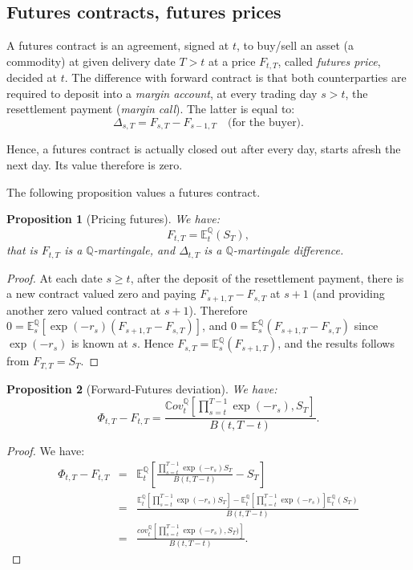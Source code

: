 \documentclass[
  12pt,
]{book}
\newtheorem{proposition}{Proposition}[chapter]
\theoremstyle{definition}
\theoremstyle{definition}
\theoremstyle{definition}
\theoremstyle{definition}
\theoremstyle{remark}
\begin{document}
\hypertarget{FCFPFutures}{%
\subsection{Futures contracts, futures prices}\label{FCFPFutures}}

A futures contract is an agreement, signed at \(t\), to buy/sell an asset (a commodity) at given delivery date \(T>t\) at a price \(F_{t,T}\), called \emph{futures price}, decided at \(t\). The difference with forward contract is that both counterparties are required to deposit into a \emph{margin account}, at every trading day \(s>t\), the resettlement payment (\emph{margin call}). The latter is equal to:
\[
\Delta_{s,T} = F_{s,T} - F_{s-1,T} \quad \mbox{(for the buyer)}.
\]

Hence, a futures contract is actually closed out after every day, starts afresh the next day. Its value therefore is zero.

The following proposition values a futures contract.

\begin{proposition}[Pricing futures]
\protect\hypertarget{prp:future}{}\label{prp:future}We have:
\[
F_{t,T} = \mathbb{E}^{\mathbb{Q}}_t (S_T),
\]
that is \(F_{t,T}\) is a \(\mathbb{Q}\)-martingale, and \(\Delta_{t,T}\) is a \(\mathbb{Q}\)-martingale difference.
\end{proposition}

\begin{proof}
At each date \(s\ge t\), after the deposit of the resettlement payment, there is a new contract valued zero and paying \(F_{s+1,T} - F_{s,T}\) at \(s+1\) (and providing another zero valued contract at \(s+1\)). Therefore \(0 = \mathbb{E}^{\mathbb{Q}}_s [\exp (-r_s) (F_{s+1,T} - F_{s,T})]\), and \(0 = \mathbb{E}^{\mathbb{Q}}_s (F_{s+1,T} - F_{s,T})\) since \(\exp (-r_s)\) is known at \(s\). Hence \(F_{s,T} = \mathbb{E}^{\mathbb{Q}}_s (F_{s+1,T})\), and the results follows from \(F_{T,T} = S_T\).
\end{proof}

\begin{proposition}[Forward-Futures deviation]
\protect\hypertarget{prp:FFdeviation}{}\label{prp:FFdeviation}We have:
\[
\Phi_{t,T} - F_{t,T} = \frac{\mathbb{C}ov^{\mathbb{Q}}_t \left[\prod^{T-1}_{s=t} \exp (-r_s), S_T\right]}{B(t,T-t)}.
\]
\end{proposition}

\begin{proof}
We have:
\begin{eqnarray*}
\Phi_{t,T} - F_{t,T} & = & \mathbb{E}^{\mathbb{Q}}_t \left[\frac{\prod^{T-1}_{s=t} \exp (-r_s) S_T }{B(t,T-t)}- S_T\right] \\
&=& \frac{\mathbb{E}^{\mathbb{Q}}_t \left[\prod^{T-1}_{s=t} \exp (-r_s) S_T\right] - \mathbb{E}^{\mathbb{Q}}_t \left[\prod^{T-1}_{s=t} \exp (-r_s)\right] \mathbb{E}^{\mathbb{Q}}_t (S_T)}{B(t,T-t)} \\
&=&\frac{cov^{\mathbb{Q}}_t \left[\prod^{T-1}_{s=t} \exp (-r_s), S_T)\right]}{B(t,T-t)}. \end{eqnarray*}
\end{proof}
\end{document}
